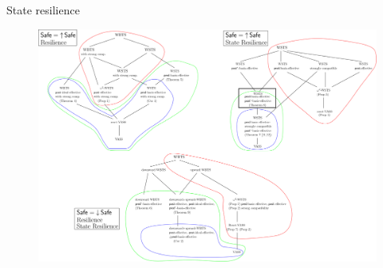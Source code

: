 \documentclass{beamer}
\begin{document}
  \begin{frame}{State resilience}
 
   \begin{center}
 	\begin{figure}
 	\vspace{-0.25cm}
\includegraphics[width=1.00\textwidth]{resultB}
	\end{figure}
\end{center}  



\nocite{DBLP:conf/gg/Ozkan22}
 
  \end{frame}
\end{document}
